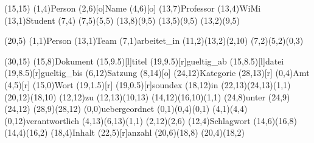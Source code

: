 \documentclass[11pt,a4paper]{article}
\begin{document}
\setlength{\unitlength}{.6cm}
\begin{schema}(15,15)
  \entity(1,4){Person}
  \attr(2,6)[o]{Name}
  \attr(4,6)[o]{}
  \relation(13,7){Professor}
  \relation(13,4){WiMi}
  \relation(13,1){Student}
  \cluster(7,4){}
  \connection(7,5)(5,5){}
  \connection(13,8)(9,5){}
  \connection(13,5)(9,5){}
  \connection(13,2)(9,5){}
\end{schema}


\begin{schema}(20,5)
  \entity(1,1){Person}
  \entity(13,1){Team}
  \relation(7,1){arbeitet\_in}
  \connection(11,2)(13,2){(2,10)}
  \connection(7,2)(5,2){(0,3)}
\end{schema}


\setlength{\hermunit}{.5cm}
\begin{schema}(30,15)
\entity(15,8){Dokument}
\attr(15,9.5)[l]{titel}
\attr(19,9.5)[r]{gueltig\_ab}
\attr(15,8.5)[l]{datei}
\attr(19,8.5)[r]{gueltig\_bis}
%
\entity(6,12){Satzung}
\attr(8,14)[o]{}
%
\entity(24,12){Kategorie}
\attr(28,13)[r]{}
%
\entity(0,4){Amt}
\attr(4,5)[r]{}
%
\entity(15,0){Wort}
\attr(19,1.5)[r]{}
\attr(19,0.5)[r]{soundex}
%
\relation(18,12){in}
\connection(22,13)(24,13){(1,1)}
\connection(20,12)(18,10){}
%
\relation(12,12){zu}
\connection(12,13)(10,13){}
\connection(14,12)(16,10){(1,1)}
%
\relation(24,8){unter}
\connection(24,9)(24,12){}
\connection(28,9)(28,12){}
%
\relation(0,0){uebergeordnet}
\connection(0,1)(0,4){(0,1)}
\connection(4,1)(4,4){}
%
\relation(0,12){verantwortlich}
\connection(4,13)(6,13){(1,1)}
\connection(2,12)(2,6){}
%
\relation(12,4){Schlagwort}
\connection(14,6)(16,8){}
\connection(14,4)(16,2){}
%
\relation(18,4){Inhalt}
\attr(22,5)[r]{anzahl}
\connection(20,6)(18,8){}
\connection(20,4)(18,2){}
\end{schema}
\end{document}
